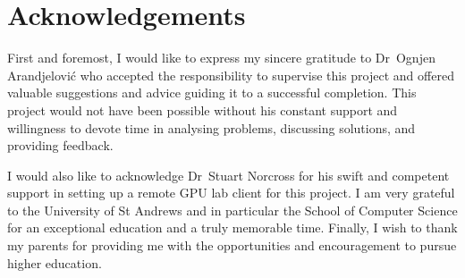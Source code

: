 \documentclass[../report.tex]{subfiles}
\begin{document}
\chapter*{Acknowledgements}

First and foremost, I would like to express my sincere gratitude to Dr~Ognjen Arandjelović who accepted the responsibility to supervise this project and offered valuable suggestions and advice guiding it to a successful completion. 
This project would not have been possible without his constant support and willingness to devote time in analysing problems, discussing solutions, and providing feedback. 

I would also like to acknowledge Dr~Stuart Norcross for his swift and competent support in setting up a remote GPU lab client for this project. 
I am very grateful to the University of St Andrews and in particular the School of Computer Science for an exceptional education and a truly memorable time. 
Finally, I wish to thank my parents for providing me with the opportunities and encouragement to pursue higher education.
\end{document}
